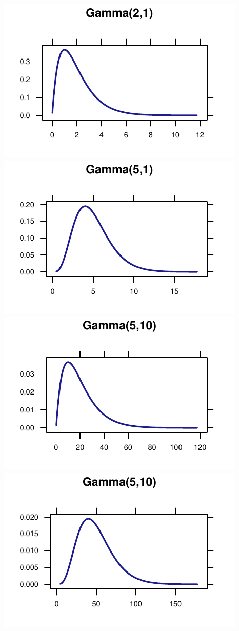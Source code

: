 \documentclass[twoside]{book}\usepackage[]{graphicx}\usepackage[]{xcolor}
\makeatletter
\def\maxwidth{ %
  \ifdim\Gin@nat@width>\linewidth
    \linewidth
  \else
    \Gin@nat@width
  \fi
}
\newenvironment{knitrout}{}{} %
\makeatother
\begin{document}
\begin{knitrout}
{\centering \includegraphics[width=\maxwidth]{figures/fig-unnamed-chunk-82-1} 
\includegraphics[width=\maxwidth]{figures/fig-unnamed-chunk-82-2} 
\includegraphics[width=\maxwidth]{figures/fig-unnamed-chunk-82-3} 
\includegraphics[width=\maxwidth]{figures/fig-unnamed-chunk-82-4} 

}
\end{knitrout}
\end{document}
